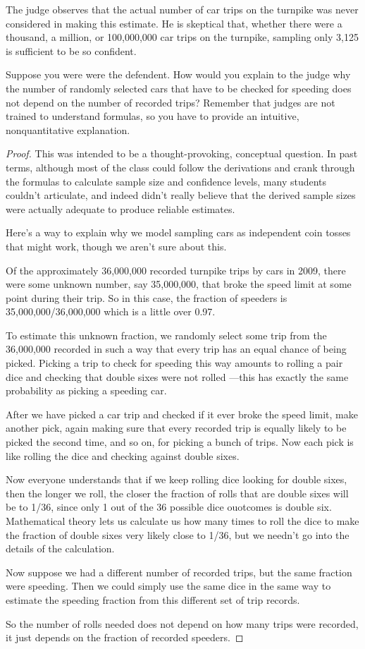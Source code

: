 \documentclass[14pt]{extarticle}
\begin{document}
The judge observes that the actual number of car trips on the turnpike was never considered in making this estimate. He is skeptical that, whether there were a thousand, a million, or 100,000,000 car trips on the turnpike, sampling only 3,125 is sufficient to be so confident.

Suppose you were were the defendent. How would you explain to the judge why the number of randomly selected cars that have to be checked for speeding does not depend on the number of recorded trips? Remem­ber that judges are not trained to understand formulas, so you have to provide an intuitive, nonquantitative explanation.

\begin{proof}
This was intended to be a thought-provoking, conceptual question. In past terms, al­though most of the class could follow the derivations and crank through the formulas to calculate sample size and confidence levels, many students couldn’t articulate, and indeed didn’t really believe that the derived sample sizes were actually adequate to produce reliable estimates.

Here’s a way to explain why we model sampling cars as independent coin tosses that might work, though we aren’t sure about this.

Of the approximately 36,000,000 recorded turnpike trips by cars in 2009, there were some unknown number, say 35,000,000, that broke the speed limit at some point during their trip. So in this case, the fraction of speeders is 35,000,000/36,000,000 which is a
little over 0.97.

To estimate this unknown fraction, we randomly select some trip from the 36,000,000 recorded in such a way that every trip has an equal chance of being picked. Picking a trip to check for speeding this way amounts to rolling a pair dice and checking that double
sixes were not rolled —this has exactly the same probability as picking a speeding car.

After we have picked a car trip and checked if it ever broke the speed limit, make another pick, again making sure that every recorded trip is equally likely to be picked the second time, and so on, for picking a bunch of trips. Now each pick is like rolling
the dice and checking against double sixes.

Now everyone understands that if we keep rolling dice looking for double sixes, then the longer we roll, the closer the fraction of rolls that are double sixes will be to 1/36, since only 1 out of the 36 possible dice ouotcomes is double six. Mathematical theory
lets us calculate us how many times to roll the dice to make the fraction of double sixes very likely close to 1/36, but we needn’t go into the details of the calculation.

Now suppose we had a different number of recorded trips, but the same fraction were speeding. Then we could simply use the same dice in the same way to estimate the speeding fraction from this different set of trip records.

So the number of rolls needed does not depend on how many trips were recorded, it just depends on the fraction of recorded speeders.
\end{proof}
\end{document}
